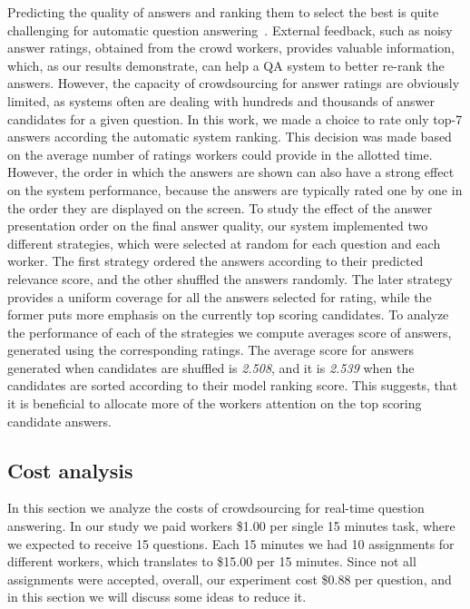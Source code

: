 \documentclass[letterpaper]{article}
\begin{document}
Predicting the quality of answers and ranking them to select the best is quite challenging for automatic question answering~\cite{surdeanu2011learning}.
External feedback, such as noisy answer ratings, obtained from the crowd workers, provides valuable information, which, as our results demonstrate, can help a QA system to better re-rank the answers.
However, the capacity of crowdsourcing for answer ratings are obviously limited, as systems often are dealing with hundreds and thousands of answer candidates for a given question.
In this work, we made a choice to rate only top-7 answers according the automatic system ranking.
This decision was made based on the average number of ratings workers could provide in the allotted time.
However, the order in which the answers are shown can also have a strong effect on the system performance, because the answers are typically rated one by one in the order they are displayed on the screen.
To study the effect of the answer presentation order on the final answer quality, our system implemented two different strategies, which were selected at random for each question and each worker.
The first strategy ordered the answers according to their predicted relevance score, and the other shuffled the answers randomly.
The later strategy provides a uniform coverage for all the answers selected for rating, while the former puts more emphasis on the currently top scoring candidates.
To analyze the performance of each of the strategies we compute averages score of answers, generated using the corresponding ratings.
The average score for answers generated when candidates are shuffled is \textit{2.508}, and it is \textit{2.539} when the candidates are sorted according to their model ranking score.
This suggests, that it is beneficial to allocate more of the workers attention on the top scoring candidate answers.

\subsection{Cost analysis}
\label{sec:analysis:cost}

In this section we analyze the costs of crowdsourcing for real-time question answering.
In our study we paid workers \$1.00 per single 15 minutes task, where we expected to receive 15 questions.
Each 15 minutes we had 10 assignments for different workers, which translates to \$15.00 per 15 minutes.
Since not all assignments were accepted, overall, our experiment cost \$0.88 per question, and in this section we will discuss some ideas to reduce it.
\end{document}
